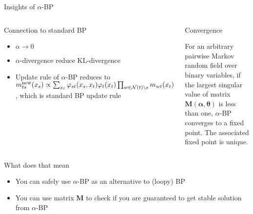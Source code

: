 \begin{frame}[label=current]{Insights of $\alpha$-BP}
  \begin{columns}
    \begin{block}{\small Connection to standard BP}
      \begin{itemize}[label=$\bullet$]
      \item $\alpha \rightarrow 0$ 
      \item $\alpha$-divergence reduce KL-divergence
      \item Update rule of $\alpha$-BP reduces to ${m}^{\text{new}}_{ts}(x_s) \propto \sum_{x_t} \varphi_{st}(x_s, x_t) {\varphi}_t(x_t) \prod_{w\in \mathcal{N}(t)\backslash s}m_{wt}(x_t)$, which is standard BP update rule
        
      \end{itemize}
    \end{block}
    \begin{block}{\small Convergence}
      \begin{theorem}
        For an arbitrary pairwise Markov random field over binary variables,
        if the largest singular value of matrix $\bm{M}(\bm{\alpha}, \bm{\theta})$ is less than one,
        $\alpha$-BP converges to a fixed point. The associated fixed point is unique.
      \end{theorem}
      \vfill
    \end{block}
  \end{columns}
  \vskip 0.5cm
  \begin{block}{\small What does that mean}
    \begin{itemize}[label=$\bullet$]
    \item You can safely use $\alpha$-BP as an alternative to (loopy) BP
    \item You can use matrix $\bm{M}$ to check if you are guaranteed to get stable solution from $\alpha$-BP
    \end{itemize}
  \end{block}
  \let\thefootnote\relax{}
\end{frame}
